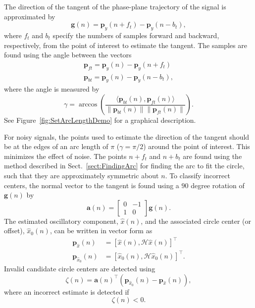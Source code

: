 \documentclass[a4paper]{IEEEtran}
\begin{document}
The direction of the tangent of the phase-plane trajectory of the signal is approximated by 
\begin{equation}
	\mathbf{g}(n) = \mathbf{p}_y(n + f_t) - \mathbf{p}_y(n - b_t),
\end{equation}
where $f_t$ and $b_t$ specify the numbers of samples forward and backward, respectively, from the point of interest to estimate the tangent. The samples are found using the angle between the vectors
\begin{align}
	\mathbf{p}_{ft} = \mathbf{p}_y(n) - \mathbf{p}_y(n + f_t) \\
	\mathbf{p}_{bt} = \mathbf{p}_y(n) - \mathbf{p}_y(n - b_t),
\end{align}
where the angle is measured by
\begin{equation}
	\gamma = \arccos\left(\frac{\langle\mathbf{p}_{bt}(n),\mathbf{p}_{ft}(n)\rangle}{\|\mathbf{p}_{bt}(n)\| \|\mathbf{p}_{ft}(n)\|}\right).
\end{equation}
See Figure~\ref{fig:SetArcLengthDemo} for a graphical description.

For noisy signals, the points used to estimate the direction of the tangent should be at the edges of an arc length of $\pi$ ($\gamma = \pi/2$) around the point of interest. This minimizes the effect of noise. The points $n+f_t$ and $n+b_t$ are found using the method described in Sect.~\ref{sect:FindingArc} for finding the arc to fit the circle, such that they are approximately symmetric about $n$. To classify incorrect centers, the normal vector to the tangent is found using a $90$ degree rotation of $\mathbf{g}(n)$ by
\begin{equation}
	\mathbf{a}\left(n\right) = \left[\begin{array}{cc}
	0 & -1 \\
	1 & 0\end{array}\right]\mathbf{g}(n).
\end{equation}
The estimated oscillatory component, $\hat{x}(n)$, and the associated circle center (or offset), $\hat{x}_0(n)$, can be written in vector form as
\begin{align}
	\mathbf{p}_{\hat{x}}(n) &= \left[\hat{x}\left(n\right),\mathcal{H}\hat{x}\left(n\right)\right]^{\top} \\ 
	\mathbf{p}_{\hat{x}_0}\left(n\right) &= \left[\hat{x}_0\left(n\right), \mathcal{H}\hat{x}_0\left(n\right)\right]^{\top}. 
\end{align}
Invalid candidate circle centers are detected using 
\begin{equation}
    \zeta(n) = \mathbf{a}\left( n\right)^{\top}\left( \mathbf{p}_{\hat{x}_0}\left( n \right) - \mathbf{p}_{\hat{x}}\left( n\right) \right),
\end{equation}
where an incorrect estimate is detected if
\begin{equation}\label{eq:IncorrectSideClassifier}
    \zeta(n) < 0.
\end{equation} 
\end{document}
